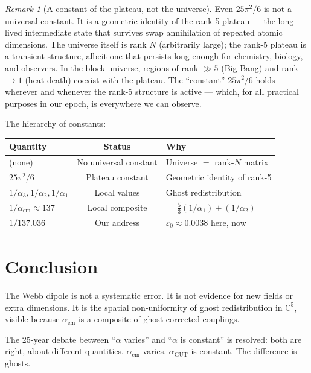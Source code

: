 \documentclass[12pt]{article}
\theoremstyle{remark}
\newtheorem{remark}[theorem]{Remark}
\begin{document}
\begin{remark}[A constant of the plateau, not the universe]
Even $25\pi^2/6$ is not a universal constant. It is a geometric identity of the rank-5 plateau --- the long-lived intermediate state that survives swap annihilation of repeated atomic dimensions. The universe itself is rank $N$ (arbitrarily large); the rank-5 plateau is a transient structure, albeit one that persists long enough for chemistry, biology, and observers. In the block universe, regions of rank $\gg 5$ (Big Bang) and rank $\to 1$ (heat death) coexist with the plateau. The ``constant'' $25\pi^2/6$ holds wherever and whenever the rank-5 structure is active --- which, for all practical purposes in our epoch, is everywhere we can observe.

The hierarchy of constants:

\begin{center}
\begin{tabular}{lcl}
\hline
Quantity & Status & Why \\
\hline
(none) & No universal constant & Universe $=$ rank-$N$ matrix \\
$25\pi^2/6$ & Plateau constant & Geometric identity of rank-5 \\
$1/\alpha_3, 1/\alpha_2, 1/\alpha_1$ & Local values & Ghost redistribution \\
$1/\alpha_\text{em} \approx 137$ & Local composite & $= \tfrac{5}{3}(1/\alpha_1) + (1/\alpha_2)$ \\
$1/137.036$ & Our address & $\varepsilon_0 \approx 0.0038$ here, now \\
\hline
\end{tabular}
\end{center}
\end{remark}

\section{Conclusion}

The Webb dipole is not a systematic error. It is not evidence for new fields or extra dimensions. It is the spatial non-uniformity of ghost redistribution in $\mathbb{C}^5$, visible because $\alpha_\text{em}$ is a composite of ghost-corrected couplings.

The 25-year debate between ``$\alpha$ varies'' and ``$\alpha$ is constant'' is resolved: both are right, about different quantities. $\alpha_\text{em}$ varies. $\alpha_\text{GUT}$ is constant. The difference is ghosts.
\end{document}
